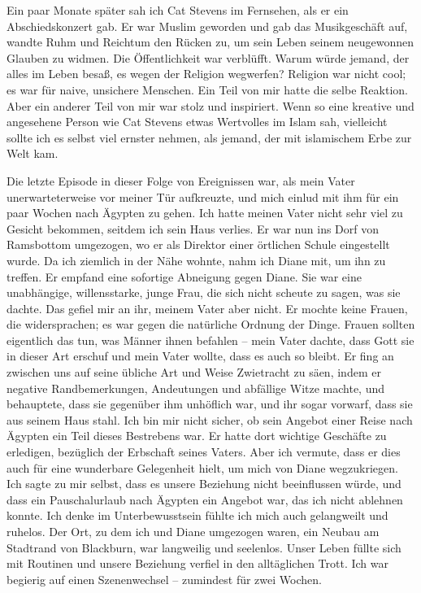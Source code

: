 \documentclass[12pt]{memoir}
\begin{document}
Ein paar Monate später sah ich Cat Stevens im Fernsehen,
als er ein Abschiedskonzert gab.
Er war Muslim geworden und gab das Musikgeschäft auf,
wandte Ruhm und Reichtum den Rücken zu,
um sein Leben seinem neugewonnen Glauben zu widmen.
Die Öffentlichkeit war verblüfft.
Warum würde jemand, der alles im Leben besaß, es wegen der Religion wegwerfen?
Religion war nicht cool; es war für naive, unsichere Menschen.
Ein Teil von mir hatte die selbe Reaktion.
Aber ein anderer Teil von mir war stolz und inspiriert.
Wenn so eine kreative und angesehene Person wie Cat Stevens
etwas Wertvolles im Islam sah,
vielleicht sollte ich es selbst viel ernster nehmen,
als jemand, der mit islamischem Erbe zur Welt kam.

Die letzte Episode in dieser Folge von Ereignissen war,
als mein Vater unerwarteterweise vor meiner Tür aufkreuzte,
und mich einlud mit ihm für ein paar Wochen nach Ägypten zu gehen.
Ich hatte meinen Vater nicht sehr viel zu Gesicht bekommen,
seitdem ich sein Haus verlies.
Er war nun ins Dorf von Ramsbottom umgezogen,
wo er als Direktor einer örtlichen Schule eingestellt wurde.
Da ich ziemlich in der Nähe wohnte, nahm ich Diane mit, um ihn zu treffen.
Er empfand eine sofortige Abneigung gegen Diane.
Sie war eine unabhängige, willensstarke, junge Frau,
die sich nicht scheute zu sagen, was sie dachte.
Das gefiel mir an ihr, meinem Vater aber nicht.
Er mochte keine Frauen, die widersprachen;
es war gegen die natürliche Ordnung der Dinge.
Frauen sollten eigentlich das tun, was Männer ihnen befahlen –
mein Vater dachte, dass Gott sie in dieser Art erschuf und mein Vater wollte,
dass es auch so bleibt.
Er fing an zwischen uns auf seine übliche Art und Weise Zwietracht zu säen,
indem er negative Randbemerkungen, Andeutungen und abfällige Witze machte,
und behauptete, dass sie gegenüber ihm unhöflich war, und ihr sogar vorwarf,
dass sie aus seinem Haus stahl.
Ich bin mir nicht sicher, ob sein Angebot einer Reise nach Ägypten
ein Teil dieses Bestrebens war.
Er hatte dort wichtige Geschäfte zu erledigen,
bezüglich der Erbschaft seines Vaters.
Aber ich vermute, dass er dies auch für eine wunderbare Gelegenheit hielt,
um mich von Diane wegzukriegen.
Ich sagte zu mir selbst, dass es unsere Beziehung nicht beeinflussen würde,
und dass ein Pauschalurlaub nach Ägypten ein Angebot war,
das ich nicht ablehnen konnte.
Ich denke im Unterbewusstsein fühlte ich mich auch gelangweilt und ruhelos.
Der Ort, zu dem ich und Diane umgezogen waren,
ein Neubau am Stadtrand von Blackburn, war langweilig und seelenlos.
Unser Leben füllte sich mit Routinen und unsere Beziehung
verfiel in den alltäglichen Trott.
Ich war begierig auf einen Szenenwechsel – zumindest für zwei Wochen.
\end{document}
